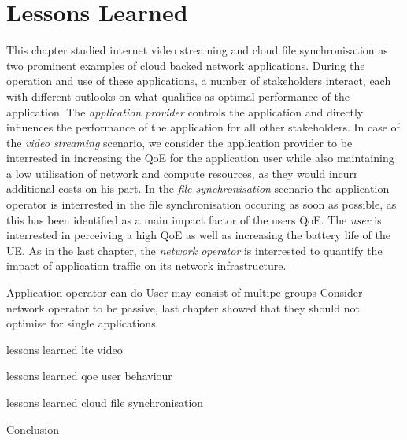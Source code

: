 \section{Lessons Learned}\label{sec:application:lessons_learned}
This chapter studied internet video streaming and cloud file synchronisation as two prominent examples of cloud backed network applications.
During the operation and use of these applications, a number of stakeholders interact, each with different outlooks on what qualifies as optimal performance of the application.
The \emph{application provider} controls the application and directly influences the performance of the application for all other stakeholders.
In case of the \emph{video streaming} scenario, we consider the application provider to be interrested in increasing the \gls{QoE} for the application user while also maintaining a low utilisation of network and compute resources, as they would incurr additional costs on his part.
In the \emph{file synchronisation} scenario the application operator is interrested in the file synchronisation occuring as soon as possible, as this has been identified as a main impact factor of the users \gls{QoE}.
The \emph{user} is interrested in perceiving a high \gls{QoE} as well as increasing the battery life of the \gls{UE}.
As in the last chapter, the \emph{network operator} is interrested to quantify the impact of application traffic on its network infrastructure.

Application operator can do
User may consist of multipe groups
Consider network operator to be passive, last chapter showed that they should not optimise for single applications

lessons learned lte video

lessons learned qoe user behaviour

lessons learned cloud file synchronisation

Conclusion